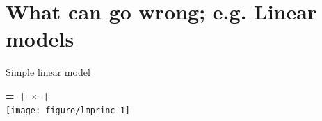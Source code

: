 \documentclass{beamer}\usepackage[]{graphicx}\usepackage[]{color}
\newenvironment{knitrout}{}{} %
\begin{document}
\section{What can go wrong; e.g. Linear models}
\begin{frame}[fragile]{Simple linear model}

\centering

  \textbf{{\color{purple}{Response}} = {\color{blue}{Intercept}} + {\color{red}{Slope}} $\times$ {\color{orange}{Predictor}} + {\color{gray}{Error}}} \\

\begin{knitrout}\small
{}\color{fgcolor}
\texttt{[image: figure/lmprinc-1]} 

\end{knitrout}
\end{frame}
\end{document}
